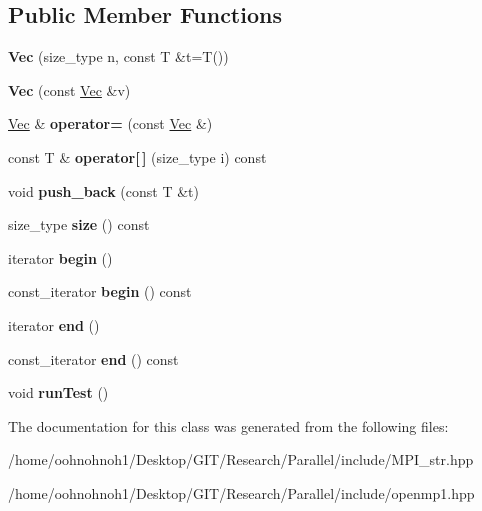\subsection*{Public Member Functions}
\begin{DoxyCompactItemize}
\item 
\mbox{\label{classVec_ac0a05e27809664ffb591f1c399ec1619}} 
{\bfseries Vec} (size\+\_\+type n, const T \&t=T())
\item 
\mbox{\label{classVec_a90bf23efb6803d9169953dc4d1b56279}} 
{\bfseries Vec} (const \hyperlink{classVec}{Vec} \&v)
\item 
\mbox{\label{classVec_a2f2d56035baaf1c59273ca133e9f0d92}} 
\hyperlink{classVec}{Vec} \& {\bfseries operator=} (const \hyperlink{classVec}{Vec} \&)
\item 
\mbox{\label{classVec_ad247d9fb26a955a24834396d89d17cdc}} 
const T \& {\bfseries operator\mbox{[}$\,$\mbox{]}} (size\+\_\+type i) const
\item 
\mbox{\label{classVec_a3eca41d5ac2286fa53786b60da27c6f1}} 
void {\bfseries push\+\_\+back} (const T \&t)
\item 
\mbox{\label{classVec_ae12d835a4e1789437cb38f78538e79c4}} 
size\+\_\+type {\bfseries size} () const
\item 
\mbox{\label{classVec_a4cc27fcb57f4f23c9eec6c88c71d5943}} 
iterator {\bfseries begin} ()
\item 
\mbox{\label{classVec_a7754cd19c8156677775ee13653460bbe}} 
const\+\_\+iterator {\bfseries begin} () const
\item 
\mbox{\label{classVec_a31cec2f83fbb4fcf6023b4eae8b03bab}} 
iterator {\bfseries end} ()
\item 
\mbox{\label{classVec_a151d00721f5f5668f4b37e408c2dc440}} 
const\+\_\+iterator {\bfseries end} () const
\item 
\mbox{\label{classVec_a8ceac4b6f24b88fbd768e185e10ac788}} 
void {\bfseries run\+Test} ()
\end{DoxyCompactItemize}


The documentation for this class was generated from the following files\+:\begin{DoxyCompactItemize}
\item 
/home/oohnohnoh1/\+Desktop/\+G\+I\+T/\+Research/\+Parallel/include/M\+P\+I\+\_\+str.\+hpp\item 
/home/oohnohnoh1/\+Desktop/\+G\+I\+T/\+Research/\+Parallel/include/openmp1.\+hpp\end{DoxyCompactItemize}

